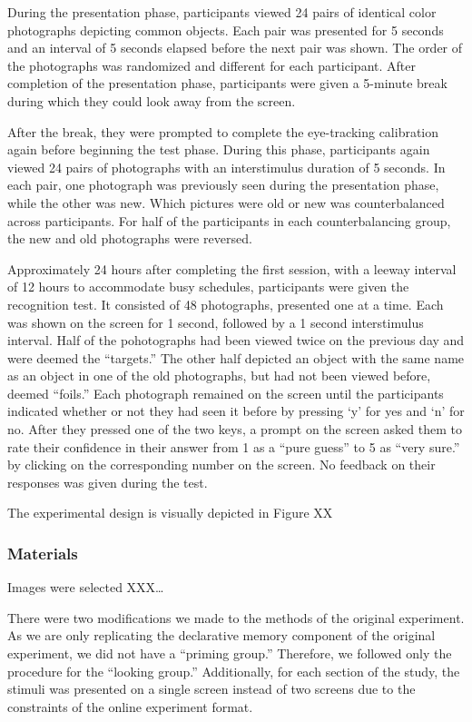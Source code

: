 \documentclass[
  english,
  man,floatsintext]{apa6}
\begin{document}
During the presentation phase, participants viewed 24 pairs of identical color photographs depicting common objects. Each pair was presented for 5 seconds and an interval of 5 seconds elapsed before the next pair was shown. The order of the photographs was randomized and different for each participant. After completion of the presentation phase, participants were given a 5-minute break during which they could look away from the screen.

After the break, they were prompted to complete the eye-tracking calibration again before beginning the test phase. During this phase, participants again viewed 24 pairs of photographs with an interstimulus duration of 5 seconds. In each pair, one photograph was previously seen during the presentation phase, while the other was new. Which pictures were old or new was counterbalanced across participants. For half of the participants in each counterbalancing group, the new and old photographs were reversed.

Approximately 24 hours after completing the first session, with a leeway interval of 12 hours to accommodate busy schedules, participants were given the recognition test. It consisted of 48 photographs, presented one at a time. Each was shown on the screen for 1 second, followed by a 1 second interstimulus interval. Half of the pohotographs had been viewed twice on the previous day and were deemed the ``targets.'' The other half depicted an object with the same name as an object in one of the old photographs, but had not been viewed before, deemed ``foils.'' Each photograph remained on the screen until the participants indicated whether or not they had seen it before by pressing `y' for yes and `n' for no. After they pressed one of the two keys, a prompt on the screen asked them to rate their confidence in their answer from 1 as a ``pure guess'' to 5 as ``very sure.'' by clicking on the corresponding number on the screen. No feedback on their responses was given during the test.

The experimental design is visually depicted in Figure XX

\hypertarget{materials}{%
\subsubsection{Materials}\label{materials}}

Images were selected XXX\ldots{}

There were two modifications we made to the methods of the original experiment. As we are only replicating the declarative memory component of the original experiment, we did not have a ``priming group.'' Therefore, we followed only the procedure for the ``looking group.'' Additionally, for each section of the study, the stimuli was presented on a single screen instead of two screens due to the constraints of the online experiment format.
\end{document}
